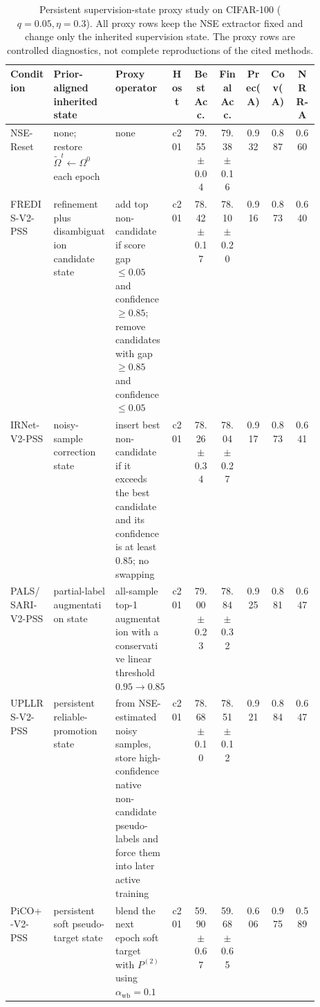 \begin{table}[t]
\centering
\tiny
\setlength{\tabcolsep}{2pt}
\begin{tabular}{p{0.14\linewidth}|p{0.20\linewidth}|p{0.18\linewidth}|c|c|c|c|c|c}
\toprule
\textbf{Condition} & \textbf{Prior-aligned inherited state} & \textbf{Proxy operator} & \textbf{Host} & \textbf{Best Acc.} & \textbf{Final Acc.} & \textbf{Prec(A)} & \textbf{Cov(A)} & \textbf{NRR-A} \\
\midrule
\rowcolor{gray!15} NSE-Reset & none; restore $\tilde{\Omega}^t\leftarrow\Omega^0$ each epoch & none & c201 & 79.55$\pm$0.04 & 79.38$\pm$0.16 & 0.932 & 0.887 & 0.660 \\
\hline
FREDIS-V2-PSS & refinement plus disambiguation candidate state & add top non-candidate if score gap $\le0.05$ and confidence $\ge0.85$; remove candidates with gap $\ge0.85$ and confidence $\le0.05$ & c201 & 78.42$\pm$0.17 & 78.10$\pm$0.20 & 0.916 & 0.873 & 0.640 \\
\hline
IRNet-V2-PSS & noisy-sample correction state & insert best non-candidate if it exceeds the best candidate and its confidence is at least $0.85$; no swapping & c201 & 78.26$\pm$0.34 & 78.04$\pm$0.27 & 0.917 & 0.873 & 0.641 \\
\hline
PALS/SARI-V2-PSS & partial-label augmentation state & all-sample top-1 augmentation with a conservative linear threshold $0.95\rightarrow0.85$ & c201 & 79.00$\pm$0.23 & 78.84$\pm$0.32 & 0.925 & 0.881 & 0.647 \\
\hline
UPLLRS-V2-PSS & persistent reliable-promotion state & from NSE-estimated noisy samples, store high-confidence native non-candidate pseudo-labels and force them into later active training & c201 & 78.68$\pm$0.10 & 78.51$\pm$0.12 & 0.921 & 0.884 & 0.647 \\
\hline
PiCO+-V2-PSS & persistent soft pseudo-target state & blend the next epoch soft target with $P^{(2)}$ using $\alpha_{\mathrm{wb}}=0.1$ & c201 & 59.90$\pm$0.67 & 59.68$\pm$0.65 & 0.606 & 0.975 & 0.589 \\
\bottomrule
\end{tabular}
\caption{Persistent supervision-state proxy study on CIFAR-100 ($q=0.05,\eta=0.3$). All proxy rows keep the NSE extractor fixed and change only the inherited supervision state. The proxy rows are controlled diagnostics, not complete reproductions of the cited methods.}
\label{tab:source_restoration_results}
\end{table}

